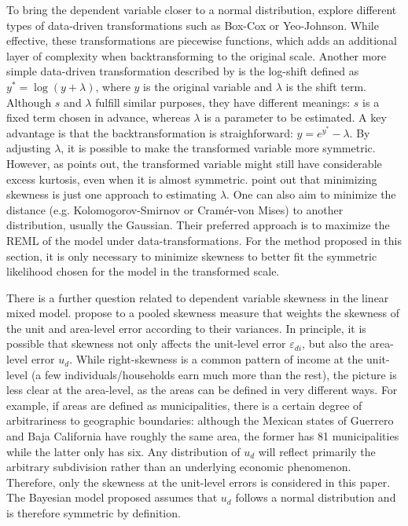 To bring the dependent variable closer to a normal distribution, \cite{rojas_perilla_data_2020} explore different types of data-driven transformations such as Box-Cox or Yeo-Johnson.
While effective, these transformations are piecewise functions, which adds an additional layer of complexity when backtransforming to the original scale.
Another more simple data-driven transformation described by \cite{rojas_perilla_data_2020} is the log-shift defined as $y^* = \log(y + \lambda)$, where $y$ is the original variable and $\lambda$ is the shift term. Although $s$ and $\lambda$ fulfill similar purposes, they have different meanings: $s$ is a fixed term chosen in advance, whereas $\lambda$ is a parameter to be estimated.
A key advantage is that the backtransformation is straighforward: $y = e^{y^*} - \lambda$.
By adjusting $\lambda$, it is possible to make the transformed variable more symmetric.
However, as \cite{morelli_hierarchical_2021} points out, the transformed variable might still have considerable excess kurtosis, even when it is almost symmetric.
\cite{rojas_perilla_data_2020} point out that minimizing skewness is just one approach to estimating $\lambda$.
One can also aim to minimize the distance (e.g. Kolomogorov-Smirnov or Cramér-von Mises) to another distribution, usually the Gaussian.
Their preferred approach is to maximize the REML of the model under data-transformations.
For the method proposed in this section, it is only necessary to minimize skewness to better fit the symmetric likelihood chosen for the model in the transformed scale.

There is a further question related to dependent variable skewness in the linear mixed model.
\cite{rojas_perilla_data_2020} propose to a pooled skewness measure that weights the skewness of the unit and area-level error according to their variances.
In principle, it is possible that skewness not only affects the unit-level error $\varepsilon_{di}$, but also the area-level error $u_{d}$.
While right-skewness is a common pattern of income at the unit-level (a few individuals/households earn much more than the rest), the picture is less clear at the area-level, as the areas can be defined in very different ways.
For example, if areas are defined as municipalities, there is a certain degree of arbitrariness to geographic boundaries:
although the Mexican states of Guerrero and Baja California have roughly the same area, the former has 81 municipalities while the latter only has six.
Any distribution of $u_d$ will reflect primarily the arbitrary subdivision rather than an underlying economic phenomenon.
Therefore, only the skewness at the unit-level errors is considered in this paper.
The Bayesian model proposed assumes that $u_d$ follows a normal distribution and is therefore symmetric by definition.

